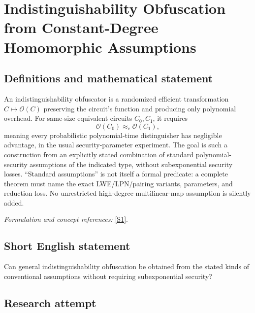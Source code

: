 \documentclass[11pt,a4paper]{article}
\newcommand{\sref}[2]{\hyperlink{source:#1:#2}{[S#2]}}
\newif\ifshowcatalogue
\newcommand{\cataloguescope}[1]{\ifshowcatalogue
 \paragraph{Exact scope in the supplied catalogue.}
 \begin{quote}\small #1\end{quote}\fi}
\numberwithin{equation}{section}
\begin{document}
\setcounter{section}{0}
\clearpage
\section*{\texorpdfstring{Indistinguishability Obfuscation from Constant-Degree Homomorphic Assumptions}{Indistinguishability Obfuscation from Constant-Degree Homomorphic Assumptions}}\label{30006749}
\subsection{Definitions and mathematical statement}
An indistinguishability obfuscator is a randomized efficient transformation $C\mapsto\mathcal O(C)$ preserving the circuit's function and producing only polynomial overhead. For same-size equivalent circuits $C_0,C_1$, it requires
\[
 \mathcal O(C_0)\approx_c\mathcal O(C_1),
\]
meaning every probabilistic polynomial-time distinguisher has negligible advantage, in the usual security-parameter experiment. The goal is such a construction from an explicitly stated combination of standard polynomial-security assumptions of the indicated type, without subexponential security losses. ``Standard assumptions'' is not itself a formal predicate: a complete theorem must name the exact LWE/LPN/pairing variants, parameters, and reduction loss. No unrestricted high-degree multilinear-map assumption is silently added.
\par\smallskip\textit{Formulation and concept references:} \sref{30006749}{1}.
\cataloguescope{Construct indistinguishability obfuscation based purely on standard polynomial-time assumptions (such as standard LWE, LPN, and degree-2 multilinear pairings) without sub-exponential loss.}
\subsection{Short English statement}
Can general indistinguishability obfuscation be obtained from the stated kinds of conventional assumptions without requiring subexponential security?
\subsection{Research attempt}
\end{document}
